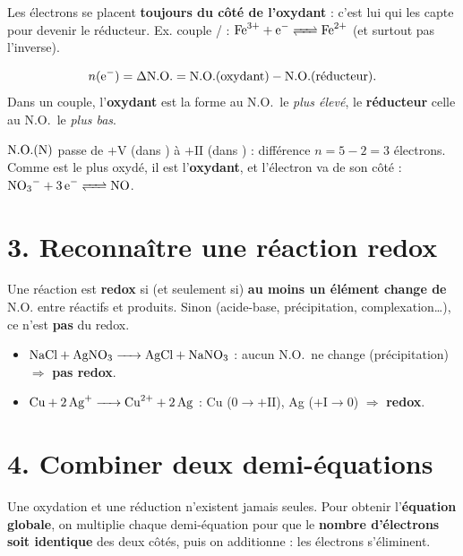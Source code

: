 \documentclass[11pt,a4paper]{article}
\newcommand{\NO}{\ensuremath{\mathrm{N.O.}}}
\begin{document}
\begin{attention}
Les électrons se placent \textbf{toujours du côté de l'oxydant} : c'est lui qui les capte pour
devenir le réducteur. Ex. couple / : $\ce{Fe^{3+} + e^- <=> Fe^{2+}}$
(et surtout pas l'inverse).
\end{attention}

\begin{regle}
\[
n(\ce{e^-}) = \Delta\NO = \NO(\text{oxydant}) - \NO(\text{réducteur}).
\]
Dans un couple, l'\textbf{oxydant} est la forme au \NO\ le \emph{plus élevé}, le \textbf{réducteur}
celle au \NO\ le \emph{plus bas}.
\end{regle}

\begin{exemple}[le couple \ce{NO3^-}/\ce{NO}]
$\NO(\ce{N})$ passe de $+\mathrm{V}$ (dans ) à $+\mathrm{II}$ (dans ) : différence
$n=5-2=3$ électrons. Comme  est le plus oxydé, il est l'\textbf{oxydant}, et l'électron va
de son côté : $\ce{NO3^- + 3 e^- <=> NO}$.
\end{exemple}

\section*{3. Reconnaître une réaction redox}
\begin{methode}
Une réaction est \textbf{redox} si (et seulement si) \textbf{au moins un élément change de \NO}
entre réactifs et produits. Sinon (acide-base, précipitation, complexation\ldots), ce n'est
\textbf{pas} du redox.
\end{methode}

\begin{exemple}
\begin{itemize}[leftmargin=1.5em,topsep=1pt,itemsep=1pt]
  \item $\ce{NaCl + AgNO3 -> AgCl + NaNO3}$ : aucun \NO\ ne change (précipitation) $\Rightarrow$ \textbf{pas redox}.
  \item $\ce{Cu + 2 Ag+ -> Cu^{2+} + 2 Ag}$ : Cu ($0\to+\mathrm{II}$), Ag ($+\mathrm{I}\to 0$) $\Rightarrow$ \textbf{redox}.
\end{itemize}
\end{exemple}

\section*{4. Combiner deux demi-équations}
Une oxydation et une réduction n'existent jamais seules. Pour obtenir l'\textbf{équation globale},
on multiplie chaque demi-équation pour que le \textbf{nombre d'électrons soit identique} des deux
côtés, puis on additionne : les électrons s'éliminent.
\end{document}
